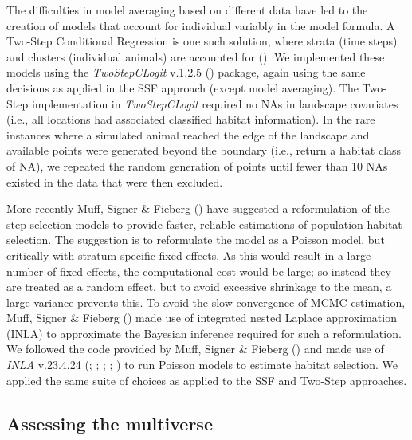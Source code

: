 \documentclass[10pt,a4paper]{article}
\begin{document}
The difficulties in model averaging based on different data have led to the creation of models that account for individual variably in the model formula.
A Two-Step Conditional Regression is one such solution, where strata (time steps) and clusters (individual animals) are accounted for ().
We implemented these models using the \emph{TwoStepCLogit} v.1.2.5 () package, again using the same decisions as applied in the SSF approach (except model averaging).
The Two-Step implementation in \emph{TwoStepCLogit} required no NAs in landscape covariates (i.e., all locations had associated classified habitat information).
In the rare instances where a simulated animal reached the edge of the landscape and available points were generated beyond the boundary (i.e., return a habitat class of NA), we repeated the random generation of points until fewer than 10 NAs existed in the data that were then excluded.

More recently Muff, Signer \& Fieberg () have suggested a reformulation of the step selection models to provide faster, reliable estimations of population habitat selection.
The suggestion is to reformulate the model as a Poisson model, but critically with stratum-specific fixed effects.
As this would result in a large number of fixed effects, the computational cost would be large; so instead they are treated as a random effect, but to avoid excessive shrinkage to the mean, a large variance prevents this.
To avoid the slow convergence of MCMC estimation, Muff, Signer \& Fieberg () made use of integrated nested Laplace approximation (INLA) to approximate the Bayesian inference required for such a reformulation.
We followed the code provided by Muff, Signer \& Fieberg () and made use of \emph{INLA} v.23.4.24 (; ; ; ; ) to run Poisson models to estimate habitat selection.
We applied the same suite of choices as applied to the SSF and Two-Step approaches.

\subsection{Assessing the multiverse}\label{assessing-the-multiverse}
\end{document}
